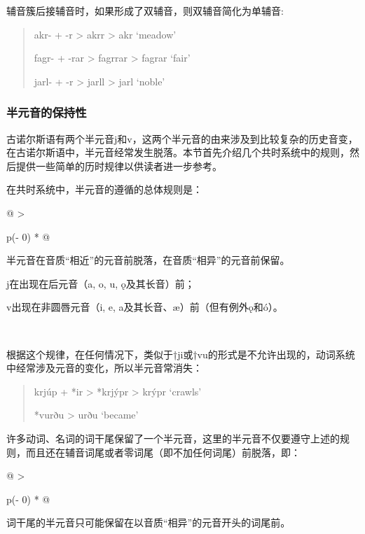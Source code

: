 辅音簇后接辅音时，如果形成了双辅音，则双辅音简化为单辅音:

\begin{quote}
akr- + -r \textgreater{} akrr \textgreater{} akr `meadow'

fagr- + -rar \textgreater{} fagrrar \textgreater{} fagrar `fair'

jarl- + -r \textgreater{} jarll \textgreater{} jarl `noble'
\end{quote}

\subsubsection{半元音的保持性}\label{半元音的保持性}

古诺尔斯语有两个半元音j和v，这两个半元音的由来涉及到比较复杂的历史音变，在古诺尔斯语中，半元音经常发生脱落。本节首先介绍几个共时系统中的规则，然后提供一些简单的历时规律以供读者进一步参考。

在共时系统中，半元音的遵循的总体规则是：

\begin{longtable}[]{@{}
  >{\raggedright\arraybackslash}p{(\columnwidth - 0\tabcolsep) * }@{}}
\toprule\noalign{}
\begin{minipage}[b]{\linewidth}\raggedright
半元音在音质``相近''的元音前脱落，在音质``相异''的元音前保留。

j在出现在后元音（a, o, u, ǫ及其长音）前；

v出现在非圆唇元音（i, e, a及其长音、æ）前（但有例外ǫ和ó）。
\end{minipage} \\
\midrule\noalign{}
\endhead
\bottomrule\noalign{}
\endlastfoot
\end{longtable}

根据这个规律，在任何情况下，类似于†ji或†vu的形式是不允许出现的，动词系统中经常涉及元音的变化，所以半元音常消失：

\begin{quote}
krjúp + *ir \textgreater{} *krjýpr \textgreater{} krýpr `crawls'

*vurðu \textgreater{} urðu `became'
\end{quote}

许多动词、名词的词干尾保留了一个半元音，这里的半元音不仅要遵守上述的规则，而且还在辅音词尾或者零词尾（即不加任何词尾）前脱落，即：

\begin{longtable}[]{@{}
  >{\raggedright\arraybackslash}p{(\columnwidth - 0\tabcolsep) * }@{}}
\toprule\noalign{}
\begin{minipage}[b]{\linewidth}\raggedright
词干尾的半元音只可能保留在以音质``相异''的元音开头的词尾前。
\end{minipage} \\
\midrule\noalign{}
\endhead
\bottomrule\noalign{}
\endlastfoot
\end{longtable}

